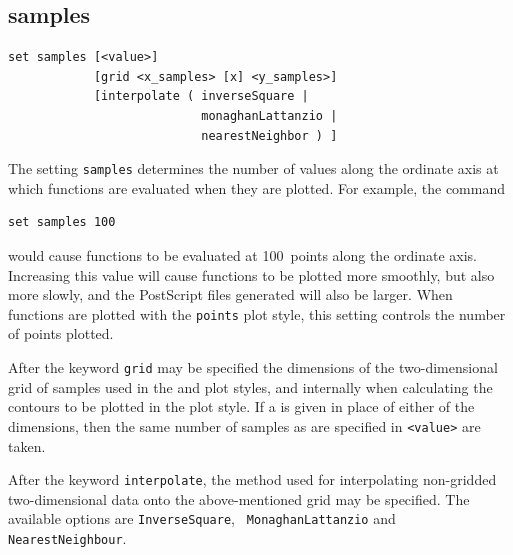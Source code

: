 %
%


\subsection{samples}

\begin{verbatim}
set samples [<value>]
            [grid <x_samples> [x] <y_samples>]
            [interpolate ( inverseSquare |
                           monaghanLattanzio |
                           nearestNeighbor ) ]
\end{verbatim}

The setting {\tt samples} determines the number of values along the ordinate
axis at which functions are evaluated when they are plotted. For example, the
command

\begin{verbatim}
set samples 100
\end{verbatim}

\noindent would cause functions to be evaluated at 100~points along the
ordinate axis.  Increasing this value will cause functions to be plotted more
smoothly, but also more slowly, and the PostScript files generated will also be
larger. When functions are plotted with the {\tt points} plot style, this
setting controls the number of points plotted.

After the keyword {\tt grid} may be specified the dimensions of the
two-dimensional grid of samples used in the  and
 plot styles, and internally when calculating the contours to
be plotted in the  plot style. If a {\tt *} is given in
place of either of the dimensions, then the same number of samples as are
specified in {\tt <value>} are taken.

After the keyword {\tt interpolate}, the method used for interpolating
non-gridded two-dimensional data onto the above-mentioned grid may be
specified. The available options are {\tt Inverse\-Square}, {\tt
Monag\-han\-Lat\-tan\-zio} and {\tt Nearest\-Neigh\-bour}.


